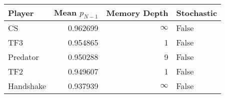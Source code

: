 \begin{tabular}{lrrl}
\toprule
    Player &  Mean $p_{N-1}$ &  Memory Depth & Stochastic \\
\midrule
        CS &        0.962699 &            \(\infty\) &      False \\
       TF3 &        0.954865 &             1 &      False \\
  Predator &        0.950288 &             9 &      False \\
       TF2 &        0.949607 &             1 &      False \\
 Handshake &        0.937939 &            \(\infty\) &      False \\
\bottomrule
\end{tabular}
